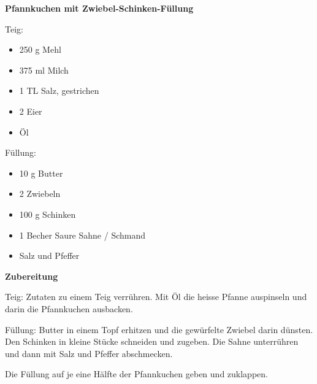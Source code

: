 

\parindent0pt	

\pagestyle{empty}


\textbf{{\LARGE Pfannkuchen mit Zwiebel-Schinken-Füllung}}%

\hrulefill


\vspace*{\fill}
\begin{multicols}{2}	

Teig:
\begin{itemize}
\item 250 g Mehl
\item 375 ml Milch
\item 1 TL Salz, gestrichen
\item 2 Eier
\item Öl
\end{itemize}
Füllung:
\begin{itemize}
\item 10 g Butter
\item 2 Zwiebeln
\item 100 g Schinken
\item 1 Becher Saure Sahne / Schmand
\item Salz und Pfeffer
\end{itemize}
\end{multicols}
\vfill									%

\vspace{1.5cm}
%
%


\vfill
\newpage
\textbf{{\LARGE Zubereitung}}%

\hrulefill

\vspace*{\fill}
\begin{multicols}{2}

Teig:\newline
Zutaten zu einem Teig verrühren. Mit Öl die heisse Pfanne auspinseln und darin die Pfannkuchen ausbacken.\newline

Füllung:\newline
Butter in einem Topf erhitzen und die gewürfelte Zwiebel darin dünsten. Den Schinken in kleine Stücke schneiden und zugeben. \newline
Die Sahne unterrühren und dann mit Salz und Pfeffer abschmecken.\newline

Die Füllung auf je eine Hälfte der Pfannkuchen geben und zuklappen.

\end{multicols}
\vfill
